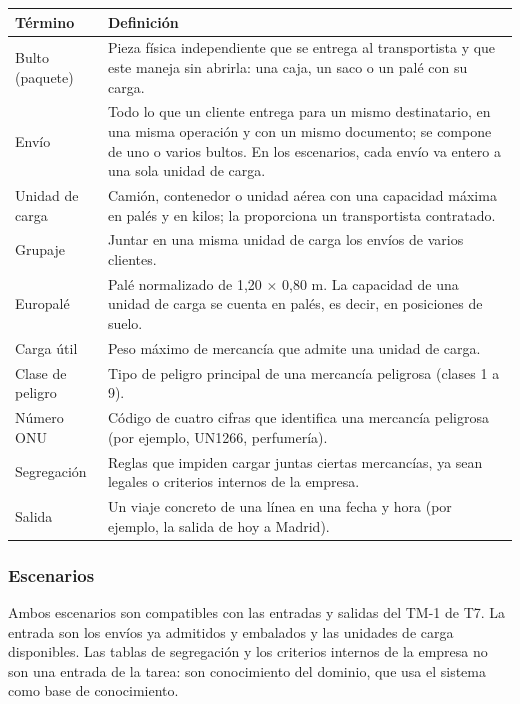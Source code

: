 \documentclass[12pt,a4paper,twoside,spanish]{article}      %
\begin{document}
{\small
\begin{tabularx}{\textwidth}{|>{\raggedright\arraybackslash}p{3.3cm}|X|} \hline
\textbf{Término} & \textbf{Definición} \\ \hline\hline
Bulto (paquete) & Pieza física independiente que se entrega al transportista y que este maneja sin abrirla: una caja, un saco o un palé con su carga. \\ \hline
Envío & Todo lo que un cliente entrega para un mismo destinatario, en una misma operación y con un mismo documento; se compone de uno o varios bultos. En los escenarios, cada envío va entero a una sola unidad de carga. \\ \hline
Unidad de carga & Camión, contenedor o unidad aérea con una capacidad máxima en palés y en kilos; la proporciona un transportista contratado. \\ \hline
Grupaje & Juntar en una misma unidad de carga los envíos de varios clientes. \\ \hline
Europalé & Palé normalizado de 1,20 $\times$ 0,80 m. La capacidad de una unidad de carga se cuenta en palés, es decir, en posiciones de suelo. \\ \hline
Carga útil & Peso máximo de mercancía que admite una unidad de carga. \\ \hline
Clase de peligro & Tipo de peligro principal de una mercancía peligrosa (clases 1 a 9). \\ \hline
Número ONU & Código de cuatro cifras que identifica una mercancía peligrosa (por ejemplo, UN1266, perfumería). \\ \hline
Segregación & Reglas que impiden cargar juntas ciertas mercancías, ya sean legales o criterios internos de la empresa. \\ \hline
Salida & Un viaje concreto de una línea en una fecha y hora (por ejemplo, la salida de hoy a Madrid). \\ \hline
\end{tabularx}
}

\subsubsection{Escenarios}

Ambos escenarios son compatibles con las entradas y salidas del TM-1 de T7.
La entrada son los envíos ya admitidos y embalados y las unidades de carga
disponibles. Las tablas de segregación y los criterios internos de la empresa
no son una entrada de la tarea: son conocimiento del dominio, que usa el
sistema como base de conocimiento.
\end{document}
